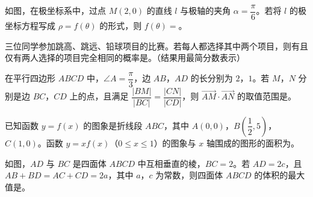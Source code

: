 \begin{question}
如图，在极坐标系中，过点 $M(2,0)$ 的直线 $l$ 与极轴的夹角 $\alpha=\dfrac\pi6$。若将 $l$ 的极坐标方程写成 $\rho=f(\theta)$ 的形式，则 $f(\theta)=$\gkblank{}。
\nopagebreak[4]
\begin{center}\end{center}
\nopagebreak[4]
\end{question}
\begin{question}
三位同学参加跳高、跳远、铅球项目的比赛。若每人都选择其中两个项目，则有且仅有两人选择的项目完全相同的概率是\gkblank{}。（结果用最简分数表示）

\end{question}
\begin{question}
在平行四边形 $ABCD$ 中，$\angle A=\dfrac\pi3$，边 $AB$，$AD$ 的长分别为 $2$，$1$。若 $M$，$N$ 分别是边 $BC$，$CD$ 上的点，且满足 $\dfrac{|BM|}{|BC|}=\dfrac{|CN|}{|CD|}$，则 $\overrightarrow{AM}\cdot\overrightarrow{AN}$ 的取值范围是\gkblank{}。

\end{question}
\begin{question}
已知函数 $y=f(x)$ 的图象是折线段 $ABC$，其中 $A(0,0)$，$B\left(\dfrac12,5\right)$，$C(1,0)$。函数 $y=xf(x)$（$0\leqslant x\leqslant1$）的图象与 $x$ 轴围成的图形的面积为\gkblank{}。

\Needspace{0.4\textheight}
\end{question}
\begin{question}
如图，$AD$ 与 $BC$ 是四面体 $ABCD$ 中互相垂直的棱，$BC=2$。若 $AD=2c$，且 $AB+BD=AC+CD=2a$，其中 $a$，$c$ 为常数，则四面体 $ABCD$ 的体积的最大值是\gkblank{}。
\nopagebreak[4]
\begin{center}\end{center}
\nopagebreak[4]
\end{question}

